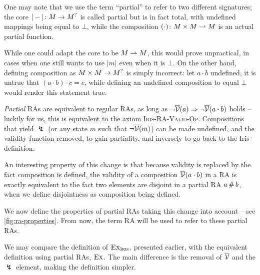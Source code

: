 \begin{remark}
	One may note that we use the term ``partial'' to refer to two different signatures; the core $|-|\colon M \rightarrow M^?$ is called partial but is in fact total, with undefined mappings being equal to $\bot$, while the composition $(\cdot)\colon M\times M\rightharpoonup M$ is an actual partial function.
	
	While one could adapt the core to be $M\rightharpoonup M$, this would prove unpractical, in cases when one still wants to use $|m|$ even when it is $\bot$. On the other hand, defining composition as $M\times M\rightarrow M^?$ is simply incorrect: let $a\cdot b$ undefined, it is untrue that $(a\cdot b)\cdot c=c$, while defining an undefined composition to equal $\bot$ would render this statement true.
\end{remark}

\emph{Partial} RAs are equivalent to regular RAs, as long as ${\neg\overline{\cal V}(a)\Rightarrow \neg\overline{\cal V}(a\cdot b)}$ holds -- luckily for us, this is equivalent to the axiom \textsc{Iris-RA-Valid-Op}. Compositions that yield $\lightning$ (or any state $m$ such that $\neg\overline{\cal V}(m)$) can be made undefined, and the validity function removed, to gain partiality, and inversely to go back to the Iris definition.

An interesting property of this change is that because validity is replaced by the fact composition is defined, the validity of a composition $\overline{\cal V}(a\cdot b)$ in a RA is exactly equivalent to the fact two elements are disjoint in a partial RA $a \operatorname{\#} b$, when we define disjointness as composition being defined.

We now define the properties of partial RAs taking this change into account -- see \autoref{fig:ra-properties}. From now, the term RA will be used to refer to these partial RAs.

We may compare the definition of $\textsc{Ex}_{\textsc{Iris}}$, presented earlier, with the equivalent definition using partial RAs, $\textsc{Ex}$. The main difference is the removal of $\overline{\cal V}$ and the $\lightning$ element, making the definition simpler.

